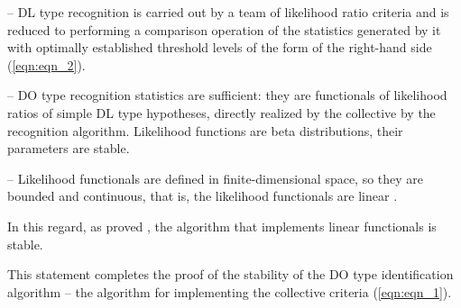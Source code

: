 -- DL type recognition is carried out by a team of likelihood ratio criteria and is reduced to performing a comparison operation of the statistics generated by it with optimally established threshold levels of the form of the right-hand side (\ref{eqn:eqn_2}).

-- DO type recognition statistics are sufficient: they are functionals of likelihood ratios of simple DL type hypotheses, directly realized by the collective by the recognition algorithm. Likelihood functions are beta distributions, their parameters are stable.

-- Likelihood functionals are defined in finite-dimensional space, so they are bounded and continuous, that is, the likelihood functionals are linear \cite{bib_17}.

In this regard, as proved \cite{bib_11}, the algorithm that implements linear functionals is stable.

This statement completes the proof of the stability of the DO type identification algorithm -- the algorithm for implementing the collective criteria (\ref{eqn:eqn_1}).
